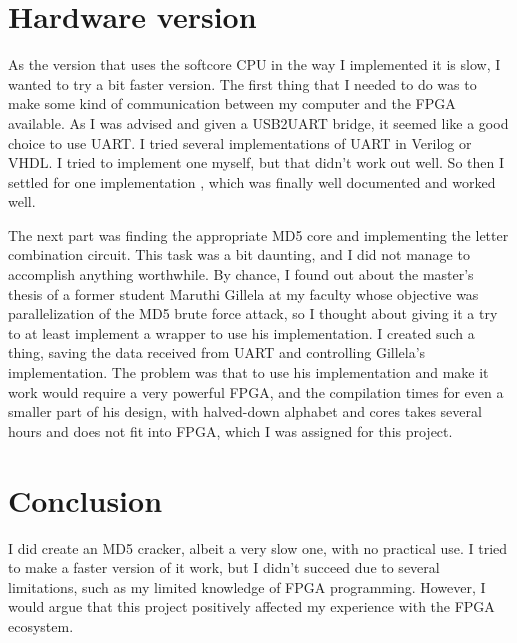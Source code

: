 \documentclass{article}
\begin{document}
    \section{Hardware version}
    As the version that uses the softcore CPU in the way I implemented it is slow, I wanted to try a bit faster version. The first thing that I needed to do was to make some kind of communication between my computer and the FPGA available. As I was advised and given a USB2UART bridge, it seemed like a good choice to use UART. I tried several implementations of UART in Verilog or VHDL. I tried to implement one myself, but that didn't work out well. So then I settled for one implementation \cite{uart-for-fpga}, which was finally well documented and worked well. 
    
    The next part was finding the appropriate MD5 core and implementing the letter combination circuit. This task was a bit daunting, and I did not manage to accomplish anything worthwhile. By chance, I found out about the master's thesis \cite{Gillela2019thesis} of a former student Maruthi Gillela at my faculty whose objective was parallelization of the MD5 brute force attack, so I thought about giving it a try to at least implement a wrapper to use his implementation. I created such a thing, saving the data received from UART and controlling Gillela's implementation. The problem was that to use his implementation and make it work would require a very powerful FPGA, and the compilation times for even a smaller part of his design, with halved-down alphabet and cores takes several hours and does not fit into FPGA, which I was assigned for this project. 

    \section{Conclusion}
    I did create an MD5 cracker, albeit a very slow one, with no practical use. I tried to make a faster version of it work, but I didn't succeed due to several limitations, such as my limited knowledge of FPGA programming. However, I would argue that this project positively affected my experience with the FPGA ecosystem. 

    
    
    \label{bibsect}
\end{document}
